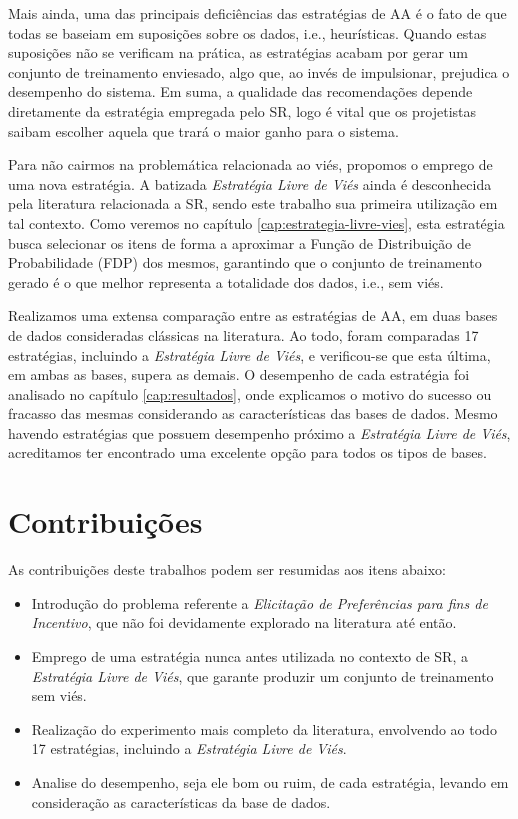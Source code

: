 Mais ainda, uma das principais deficiências das estratégias de AA é o fato de que todas se baseiam em suposições sobre os dados, i.e., heurísticas. Quando estas suposições não se verificam na prática, as estratégias acabam por gerar um conjunto de treinamento enviesado, algo que, ao invés de impulsionar, prejudica o desempenho do sistema. Em suma, a qualidade das recomendações depende diretamente da estratégia empregada pelo SR, logo é vital que os projetistas saibam escolher aquela que trará o maior ganho para o sistema. 

Para não cairmos na problemática relacionada ao viés, propomos o emprego de uma nova estratégia. A batizada \textit{Estratégia Livre de Viés} ainda é desconhecida pela literatura relacionada a SR, sendo este trabalho sua primeira utilização em tal contexto. Como veremos no capítulo \ref{cap:estrategia-livre-vies}, esta estratégia busca selecionar os itens de forma a aproximar a Função de Distribuição de Probabilidade (FDP) dos mesmos, garantindo que o conjunto de treinamento gerado é o que melhor representa a totalidade dos dados, i.e., sem viés. 

Realizamos uma extensa comparação entre as estratégias de AA, em duas bases de dados consideradas clássicas na literatura. Ao todo, foram comparadas 17 estratégias, incluindo a \textit{Estratégia Livre de Viés}, e verificou-se que esta última, em ambas as bases, supera as demais. O desempenho de cada estratégia foi analisado no capítulo \ref{cap:resultados}, onde explicamos o motivo do sucesso ou fracasso das mesmas considerando as características das bases de dados. Mesmo havendo estratégias que possuem desempenho próximo a \textit{Estratégia Livre de Viés}, acreditamos ter encontrado uma excelente opção para todos os tipos de bases.

\section{Contribuições}

As contribuições deste trabalhos podem ser resumidas aos itens abaixo:

\begin{itemize}

\item Introdução do problema referente a \textit{Elicitação de Preferências para fins de Incentivo}, que não foi devidamente explorado na literatura até então.
\item Emprego de uma estratégia nunca antes utilizada no contexto de SR, a \textit{Estratégia Livre de Viés}, que garante produzir um conjunto de treinamento sem viés.
\item Realização do experimento mais completo da literatura, envolvendo ao todo 17 estratégias, incluindo a \textit{Estratégia Livre de Viés}.
\item Analise do desempenho, seja ele bom ou ruim, de cada estratégia, levando em consideração as características da base de dados.
\end{itemize}

